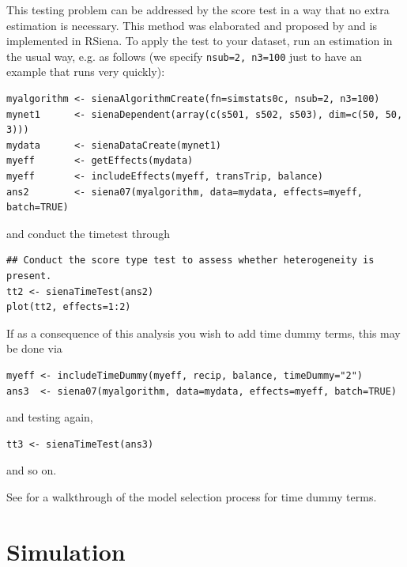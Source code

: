 \documentclass[a4paper,fleqn,11pt]{article}
\newcommand{\+}{\, + \,}
\begin{document}
This testing problem can be addressed by the score test in a way that
no extra estimation is necessary. This method was elaborated and proposed by
\citet{Lospinoso2011} and is implemented in RSiena.  To apply the
test to your dataset, run an estimation in the usual way, e.g. as follows
(we specify \texttt{nsub=2, n3=100} just to have an example that runs
very quickly):
\begin{verbatim}
myalgorithm <- sienaAlgorithmCreate(fn=simstats0c, nsub=2, n3=100)
mynet1      <- sienaDependent(array(c(s501, s502, s503), dim=c(50, 50, 3)))
mydata      <- sienaDataCreate(mynet1)
myeff       <- getEffects(mydata)
myeff       <- includeEffects(myeff, transTrip, balance)
ans2        <- siena07(myalgorithm, data=mydata, effects=myeff, batch=TRUE)
\end{verbatim}
and conduct the timetest through
\begin{verbatim}
## Conduct the score type test to assess whether heterogeneity is present.
tt2 <- sienaTimeTest(ans2)
plot(tt2, effects=1:2)
\end{verbatim}
If as a consequence of this analysis you wish to add time dummy terms,
this may be done via
\begin{verbatim}
myeff <- includeTimeDummy(myeff, recip, balance, timeDummy="2")
ans3  <- siena07(myalgorithm, data=mydata, effects=myeff, batch=TRUE)
\end{verbatim}
and testing again,
\begin{verbatim}
tt3 <- sienaTimeTest(ans3)
\end{verbatim}
and so on.

See \citet{Lospinoso2010b} for a walkthrough of the model selection process
for time dummy terms.


\newpage
\section{Simulation}
\label{S_sim}
\end{document}
